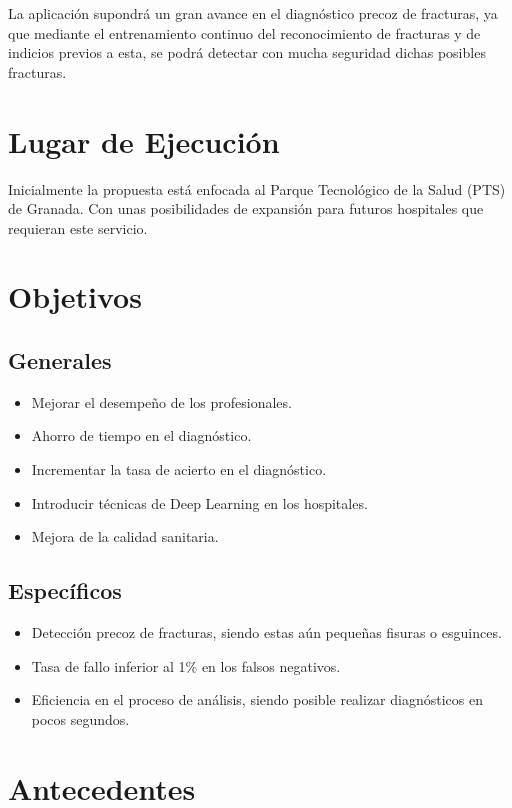 La aplicación supondrá un gran avance en el diagnóstico precoz de fracturas, ya que mediante el entrenamiento continuo del reconocimiento de fracturas y de indicios previos a esta, se podrá detectar con mucha seguridad dichas posibles fracturas.

\section{Lugar de Ejecución}

Inicialmente la propuesta está enfocada al Parque Tecnológico de la Salud (PTS) de Granada. Con unas posibilidades de expansión para futuros hospitales que requieran este servicio.

\section{Objetivos}
\subsection{Generales} 
\begin{itemize}
	\item Mejorar el desempeño de los profesionales.
	\item Ahorro de tiempo en el diagnóstico.
	\item Incrementar la tasa de acierto en el diagnóstico.
	\item Introducir técnicas de Deep Learning en los hospitales.
	\item Mejora de la calidad sanitaria.
\end{itemize}

\subsection{Específicos}
\begin{itemize}
	\item Detección precoz de fracturas, siendo estas aún pequeñas fisuras o esguinces.
	\item Tasa de fallo inferior al 1\% en los falsos negativos.
	\item Eficiencia en el proceso de análisis, siendo posible realizar diagnósticos en pocos segundos.
\end{itemize}

\section{Antecedentes}

